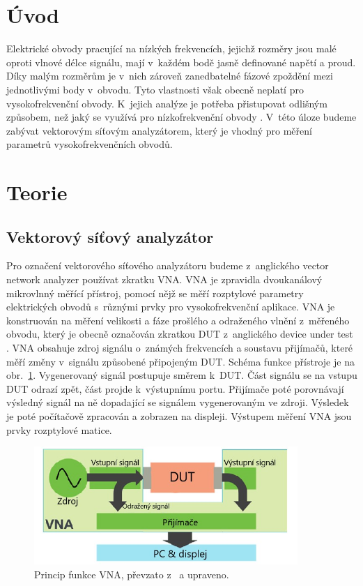 \documentclass{protokol}
\begin{document}
\headernoenv

\section{Úvod}
Elektrické obvody pracující na nízkých frekvencích,
jejichž rozměry jsou malé oproti vlnové délce signálu,
mají v~každém bodě jasně definované napětí a proud.
Díky malým rozměrům je v~nich zároveň zanedbatelné fázové zpoždění
mezi jednotlivými body v~obvodu.
Tyto vlastnosti však obecně neplatí pro vysokofrekvenční obvody.
K~jejich analýze je potřeba přistupovat odlišným způsobem,
než jaký se využívá pro nízkofrekvenční obvody \cite{pozar}.
V~této úloze budeme zabývat vektorovým síťovým analyzátorem,
který je vhodný pro měření parametrů vysokofrekvenčních obvodů.

\section{Teorie}

\subsection{Vektorový síťový analyzátor}

Pro označení vektorového síťového analyzátoru budeme z~anglického
vector network analyzer používat zkratku VNA.
VNA je zpravidla dvoukanálový mikrovlnný měřící přístroj,
pomocí nějž se měří rozptylové parametry elektrických obvodů
s~různými prvky pro vysokofrekvenční aplikace.
VNA je konstruován na měření velikosti a fáze prošlého a odraženého vlnění
z~měřeného obvodu,
který je obecně označován zkratkou DUT z~anglického device
under test \cite{pozar}.
VNA obsahuje zdroj signálu o~známých frekvencích a soustavu přijímačů,
které měří změny v~signálu způsobené připojeným DUT.
Schéma funkce přístroje je na obr.~\ref{VNA}.
Vygenerovaný signál postupuje směrem k~DUT.
Část signálu se na vstupu DUT odrazí zpět, část projde k~výstupnímu portu.
Přijímače poté porovnávají výsledný signál na ně dopadající
se signálem vygenerovaným ve zdroji.
Výsledek je poté počítačově zpracován a zobrazen na displeji.
Výstupem měření VNA jsou prvky rozptylové matice.

\begin{figure}[b]
	\centering
	\includegraphics[width=100mm,]{network-analyzer-diagram}
	\caption{Princip funkce VNA, převzato z~\cite{tektronix} a upraveno.}
	\label{VNA}
\end{figure}
\end{document}
